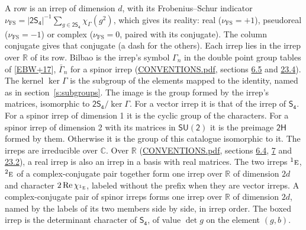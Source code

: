 \documentclass[10pt,a4paper]{article}
\numberwithin{equation}{section}
\newcommand{\grp}[1]{\mathsf{#1}}
\newcommand{\irr}[1]{\text{\normalfont\scshape #1}}
\newcommand{\conjpair}[1]{{}^{#1}}
\newcommand{\irchar}[1]{\chi_{#1}}
\newcommand{\fsind}{\nu_{\mathrm{FS}}}
\begin{document}
\leavevmode\label{n:index.frobenius}\label{n:head.irrep}\label{n:head.reality}A row is an irrep of dimension $d$, with its Frobenius--Schur indicator $\fsind = |\grp{2S_{4}}|^{-1}\allowbreak\sum_{g\in\grp{2S_{4}}}\irchar{\Gamma}(g^2)$, which gives its reality: real ($\fsind = +1$), pseudoreal ($\fsind = -1$) or complex ($\fsind = 0$, paired with its conjugate). \label{n:head.conjugate}The column conjugate gives that conjugate (a dash for the others). \label{n:head.over.real}Each irrep lies in the irrep over $\mathbb{R}$ of its row. \label{n:head.bilbao}\label{n:irrep.alias.gamma}Bilbao is the irrep's symbol $\Gamma_n$ in the double point group tables of [\href{../../../REFERENCES.pdf\#ref.EBW+17}{EBW+17}], $\bar{\Gamma}_n$ for a spinor irrep (\href{../../CONVENTIONS.pdf}{CONVENTIONS.pdf}, sections \href{../../../rotation/CONVENTIONS.pdf\#conv.6.5}{6.5} and \href{../../CONVENTIONS.pdf\#conv.23.4}{23.4}). \label{n:head.kernel}The kernel $\ker\Gamma$ is the subgroup of the elements mapped to the identity, named as in section~\ref{s:subgroups}. \label{n:head.image}The image is the group formed by the irrep's matrices, isomorphic to $\grp{2S_{4}}/\ker\Gamma$. For a vector irrep it is that of the irrep of \href{../../../rotation/data/pdf/S4.pdf}{$\grp{S_{4}}$}. For a spinor irrep of dimension 1 it is the cyclic group of the characters. For a spinor irrep of dimension 2 with its matrices in $\grp{SU(2)}$ it is the preimage $\grp{2H}$ formed by them. Otherwise it is the group of this catalogue isomorphic to it. The irreps are irreducible over $\mathbb{C}$. Over $\mathbb{R}$ (\href{../../CONVENTIONS.pdf}{CONVENTIONS.pdf}, sections \href{../../../rotation/CONVENTIONS.pdf\#conv.6.4}{6.4}, \href{../../../rotation/CONVENTIONS.pdf\#conv.7}{7} and \href{../../CONVENTIONS.pdf\#conv.23.2}{23.2}), a real irrep is also an irrep in a basis with real matrices. The two irreps $\conjpair{1}\irr{e}$, $\conjpair{2}\irr{e}$ of a complex-conjugate pair together form one irrep over $\mathbb{R}$ of dimension $2d$ and character $2\operatorname{Re}\irchar{\conjpair{1}\irr{e}}$, labeled without the prefix when they are vector irreps. A complex-conjugate pair of spinor irreps forms one irrep over $\mathbb{R}$ of dimension $2d$, named by the labels of its two members side by side, in irrep order. \label{n:mark.determinant}The boxed irrep is the determinant character of \href{../../../rotation/data/pdf/S4.pdf}{$\grp{S_{4}}$}, of value $\det g$ on the element $(g, b)$.
\setlength{\emergencystretch}{2em}\par\setlength{\emergencystretch}{0pt}
\end{document}
